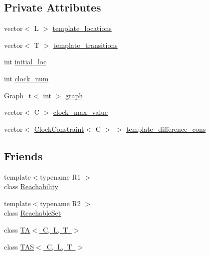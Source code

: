 \subsection*{Private Attributes}
\begin{DoxyCompactItemize}
\item 
vector$<$ L $>$ \mbox{\hyperlink{classgraphsat_1_1_t_a_t_ad3afd1fc9aa770065ed801819ed5b57b}{template\+\_\+locations}}
\item 
vector$<$ T $>$ \mbox{\hyperlink{classgraphsat_1_1_t_a_t_a028831f531e7b7fcf99bc06b7f6927c7}{template\+\_\+transitions}}
\item 
int \mbox{\hyperlink{classgraphsat_1_1_t_a_t_ac6da0456082b2738d104410aa7815968}{initial\+\_\+loc}}
\item 
int \mbox{\hyperlink{classgraphsat_1_1_t_a_t_ab96ea4a5d8f0c45be9a858710deebd77}{clock\+\_\+num}}
\item 
Graph\+\_\+t$<$ int $>$ \mbox{\hyperlink{classgraphsat_1_1_t_a_t_a73fe5698d01d546526b6c96eec8a3443}{graph}}
\item 
vector$<$ C $>$ \mbox{\hyperlink{classgraphsat_1_1_t_a_t_a88d04f7de932a0118c7224cd264b444b}{clock\+\_\+max\+\_\+value}}
\item 
vector$<$ \mbox{\hyperlink{classgraphsat_1_1_clock_constraint}{Clock\+Constraint}}$<$ C $>$ $>$ \mbox{\hyperlink{classgraphsat_1_1_t_a_t_ab1d856ff99b6e51de1d302b75adeec74}{template\+\_\+difference\+\_\+cons}}
\end{DoxyCompactItemize}
\subsection*{Friends}
\begin{DoxyCompactItemize}
\item 
{\footnotesize template$<$typename R1 $>$ }\\class \mbox{\hyperlink{classgraphsat_1_1_t_a_t_ac274586d6140dff44fa1029371c2cf48}{Reachability}}
\item 
{\footnotesize template$<$typename R2 $>$ }\\class \mbox{\hyperlink{classgraphsat_1_1_t_a_t_a8e8eb523736892bc0c9b460e370db614}{Reachable\+Set}}
\item 
class \mbox{\hyperlink{classgraphsat_1_1_t_a_t_a6c69f663d1ae371cb2f5b22d1ca6993f}{T\+A$<$ C, L, T $>$}}
\item 
class \mbox{\hyperlink{classgraphsat_1_1_t_a_t_af6e6d1ed1c059a7b2b5e7bd542ea8d83}{T\+A\+S$<$ C, L, T $>$}}
\end{DoxyCompactItemize}


